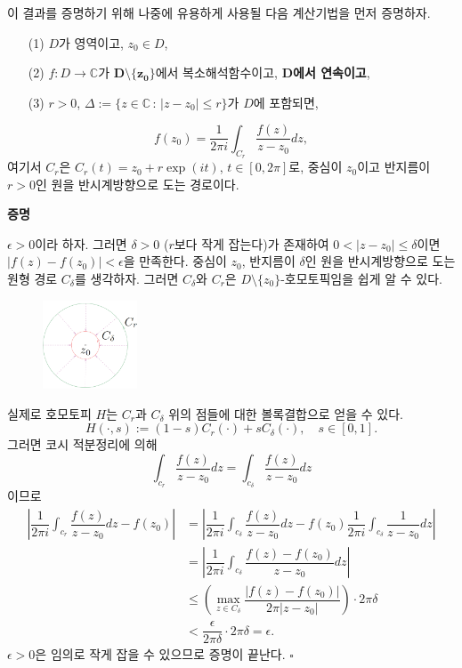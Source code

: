 이 결과를 증명하기 위해 나중에 유용하게 사용될 다음 계산기법을 먼저 증명하자.


\begin{saltprop}{}{} \label{prop-3-5}
\begin{itemize}
\item[(1)] $D$가 영역이고, $z_0\in D$,
\item[(2)] $f:D\to\mathbb C$가 $\boldsymbol{D\setminus \{z_0\}}$에서 복소해석함수이고,
\textbf{$\boldsymbol D$에서 연속이고},
\item[(3)] $r>0$, 
$\Delta := \{ z\in \mathbb C\,:\, |z-z_0| \le r\}$가 $D$에 포함되면,
\end{itemize}
\[
f(z_0) = \dfrac1{2\pi i} \int_{C_r} \dfrac{f(z)}{z-z_0} dz, 
\]
여기서 $C_r$은 $C_r(t) = z_0 + r\exp(it)$, $t\in [0,2\pi]$로,
중심이 $z_0$이고 반지름이 $r>0$인 
원을 반시계방향으로 도는 경로이다.
\end{saltprop}

{\bf 증명}

$\epsilon>0$이라 하자.
그러면 $\delta>0$ ($r$보다 작게 잡는다)가 존재하여
$0<|z-z_0|\le \delta$이면 $|f(z) - f(z_0)|<\epsilon$을 만족한다.
중심이 $z_0$, 반지름이 $\delta$인 원을 반시계방향으로 도는 원형 경로 $C_\delta$를 생각하자.
그러면
$C_\delta$와 $C_r$은 $D\setminus\{z_0\}$-호모토픽임을 쉽게 알 수 있다.

\begin{figure}[h!]
\begin{center}
\includegraphics[width=0.25\textwidth]{./SaltChapter/figs/fig-3-0-8}
\end{center}
\end{figure}

실제로 호모토피 $H$는 $C_r$과  $C_\delta$ 위의 점들에 대한 볼록결합으로 얻을 수 있다.
\[
H(\cdot, s) := (1-s)C_r(\cdot) + sC_\delta(\cdot), 
\quad s\in [0,1].
\]
그러면 코시 적분정리에 의해 
\[
\int_{c_r} \dfrac{f(z)}{z-z_0}dz = \int_{c_\delta} \dfrac{f(z)}{z-z_0}dz
\]
이므로
\begin{align*}
\left| \dfrac1{2\pi i} \int_{c_r} \dfrac{f(z)}{z-z_0}dz - f(z_0) \right|
&= \left|  \dfrac1{2\pi i}\int_{c_\delta} \dfrac{f(z)}{z-z_0}dz - 
f(z_0)  \dfrac1{2\pi i} \int_{c_\delta} \dfrac{1}{z-z_0}dz \right| \\
&= \left|  \dfrac1{2\pi i}\int_{c_\delta} \dfrac{f(z)-f(z_0)}{z-z_0}dz \right| \\
&\le \left( \max_{z\in C_\delta} \dfrac{|f(z)-f(z_0)|}{2\pi|z-z_0|}  \right) \cdot 2\pi\delta \\
&< \dfrac \epsilon{2\pi \delta} \cdot 2\pi \delta = \epsilon.
\end{align*}
$\epsilon>0$은 임의로 작게 잡을 수 있으므로 증명이 끝난다.
\hfill $\square$

